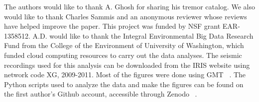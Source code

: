 \documentclass[draft]{agujournal2019}
\begin{document}
%
%

%

%




%
%
%
%
%
%
%
%


\acknowledgments
The authors would like to thank A. Ghosh for sharing his tremor catalog. We also would like to thank Charles Sammis and an anonymous reviewer whose reviews have helped improve the paper. This project was funded by NSF grant EAR-1358512. A.D. would like to thank the Integral Environmental Big Data Research Fund from the College of the Environment of University of Washington, which funded cloud computing resources to carry out the data analyses. The seismic recordings used for this analysis can be downloaded from the IRIS website using network code XG, 2009-2011. Most of the figures were done using GMT ~\cite{WES_1991}. The Python scripts used to analyze the data and make the figures can be found on the first author's Github account, accessible through Zenodo ~\cite{ariane_ducellier_2021_5062659}.
\end{document}

